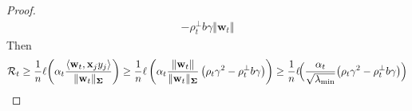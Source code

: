 \documentclass[pdflatex,sn-basic]{sn-jnl}%
\theoremstyle{thmstyleone}%
\begin{document}
\begin{appendices}
\begin{proof}
\begin{equation*}
\begin{aligned}
    - \rho_t^{\perp} b \gamma \Vert \mathbf{w}_t \Vert
  \end{aligned}
  \end{equation*}
  Then
  \begin{equation*}
  \begin{aligned}
    \mathcal{R}_t \ge 
    \frac{1}{n}
    \ell\!\left(
      \alpha_t
      \frac{\langle \mathbf{w}_t, \mathbf{x}_j y_j \rangle}{
        \Vert \mathbf{w}_t \Vert_{\mathbf{\Sigma}}
      }
    \right)
    \ge 
    \frac{1}{n} \ell \left(
      \alpha_t
      \frac{\Vert \mathbf{w}_t \Vert}{\Vert \mathbf{w}_t \Vert_{\mathbf{\Sigma}}}
      \left(
        \rho_t \gamma^2  
        - \rho_t^{\perp} b \gamma
      \right)
    \right)
    \ge 
    \frac{1}{n}\ell\!\Bigl(
      \frac{\alpha_t}{\sqrt{\lambda_{\min}}}
      \bigl(
        \rho_t \gamma^2  
        - \rho_t^{\perp} b \gamma
      \bigr)
    \Bigr)
  \end{aligned}
  \end{equation*}
\end{proof}


\end{appendices}
\end{document}

